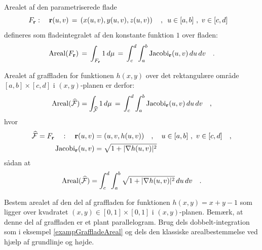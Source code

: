 \begin{definition} \label{defArealFlade}
{Arealet} af den parametriserede flade
$$F_{\bf r}: \quad {\bf r}(u,v) \, = \, \left(x(u,v), y(u,v),
z(u,v)\right) \quad , \, \, \,  u \in [a,b] \, \, , \, \,  v \in
[c,d] \quad
$$
defineres  som fladeintegralet af den konstante funktion $1$ over fladen:
\begin{equation} \label{eqFladeintegralAreal}
\operatorname{Areal}(F_{\bf r}) \, = \, \int_{F_{\bf r}} 1 \, d\mu \, = \,
\int_{c}^{d} \int_{a}^{b}  \operatorname{Jacobi}_{\bf r}(u,v)\,du \, dv \quad.
\end{equation}
\end{definition}



\begin{example} \label{exampGraffladeAreal}
Arealet af graffladen for funktionen $h(x,y)$ over det rektangulære område $[a,b]\times [c, d]$ i $(x,y)$-planen er derfor:
\begin{equation}
\operatorname{Areal}(\widehat{\mathcal{F}}) = \int_{\widehat{\mathcal{F}}} 1 \, d\mu \, = \,
\int_{c}^{d} \int_{a}^{b}  \operatorname{Jacobi}_{\bf r}(u,v)\,du \, dv \quad,
\end{equation}
hvor
\begin{equation}
\begin{aligned}
\widehat{\mathcal{F}} = F_{\mathbf{r}}\quad : \quad \mathbf{r}(u,v) &= (u, v, h(u,v)) \quad , \quad   u \in [a,b] \, \, , \, \,  v \in
[c,d]  \quad , \\
\operatorname{Jacobi}_{\mathbf{r}}(u,v) &= \sqrt{1 + |\mathbf{\nabla}h(u,v)|^{2}}
\end{aligned}
\end{equation}
sådan at
\begin{equation}
\operatorname{Areal}(\widehat{\mathcal{F}}) = \int_{c}^{d} \int_{a}^{b} \sqrt{1 + |\mathbf{\nabla}h(u,v)|^{2}}\,du \, dv \quad.
\end{equation}
\end{example}



\begin{exercise} \label{exercRektangfareal}
Bestem arealet af den del af graffladen for funktionen $h(x,y) = x+y-1$ som ligger over kvadratet $(x,y) \in [0,1]\times [0,1]$ i $(x,y)$-planen. Bemærk, at denne del af graffladen er et plant parallelogram. Brug dels dobbelt-integration som i eksempel \ref{exampGraffladeAreal} og dels den klassiske arealbestemmelse ved hjælp af grundlinje og højde.
\end{exercise}


